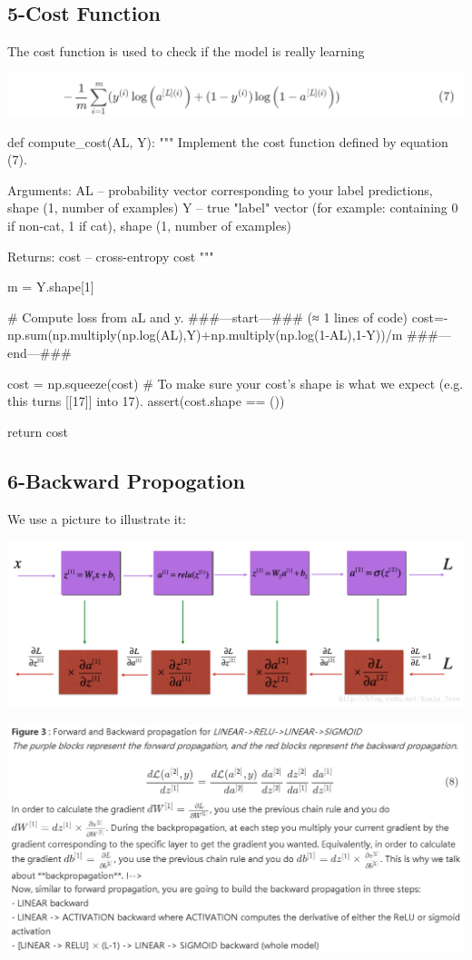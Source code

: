 \documentclass[12pt,a4paper]{article}
\begin{document}
	\subsection{5-Cost Function}
	The cost function is used to check if the model is really learning\par
	\includegraphics[scale=0.8]{image_4.png}
	\begin{python}
		def compute_cost(AL, Y):
		"""
		Implement the cost function defined by equation (7).
		
		Arguments:
		AL -- probability vector corresponding to your label predictions, shape (1, number of examples)
		Y -- true "label" vector (for example: containing 0 if non-cat, 1 if cat), shape (1, number of examples)
		
		Returns:
		cost -- cross-entropy cost
		"""
		
		m = Y.shape[1]
		
		# Compute loss from aL and y.
		###---start---### (≈ 1 lines of code)
		cost=-np.sum(np.multiply(np.log(AL),Y)+np.multiply(np.log(1-AL),1-Y))/m
		###---end---###
		
		cost = np.squeeze(cost) # To make sure your cost's shape is what we expect (e.g. this turns [[17]] into 17).
		assert(cost.shape == ())
		
		return cost
	\end{python}
	\subsection{6-Backward Propogation}
		We use a picture to illustrate it:\par
		\includegraphics[scale=0.7]{image_5.png}\par
		\includegraphics[scale=0.7]{image_6.png}\par
\end{document}
